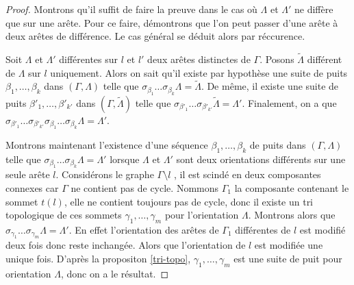 \documentclass[a4paper,10pt]{article}
\begin{document}
\begin{proof}
  Montrons qu'il suffit de faire la preuve dans le cas où $\Lambda$ et $\Lambda'$ ne diffère que sur une arête. Pour ce faire, démontrons que l'on peut passer d'une arête à deux arêtes de différence. Le cas général se déduit alors par réccurence. 

Soit $\Lambda$ et $\Lambda'$ différentes sur $l$ et $l'$ deux arêtes distinctes de $\Gamma$. Posons $\widetilde \Lambda$ différent de $\Lambda$ sur $l$ uniquement. Alors on sait qu'il existe par hypothèse une suite de puits $\beta_{1}, \dots, \beta_{k}$ dans $( \Gamma, \Lambda)$ telle que $\sigma_{\beta_{1}}\dots\sigma_{\beta_{k}}\Lambda = \widetilde \Lambda$. De même, il existe une suite de puits $\beta'_{1}, \dots, \beta'_{k'}$ dans $(\Gamma,\widetilde \Lambda)$ telle que $\sigma_{\beta'_{1}}\dots\sigma_{\beta'_{k'}} \widetilde \Lambda = \Lambda'$. Finalement, on a que $\sigma_{\beta'_{1}}\dots\sigma_{\beta'_{k'}}\sigma_{\beta_{1}}\dots\sigma_{\beta_{k}}\Lambda =  \Lambda'$. 

Montrons maintenant l'existence d'une séquence $\beta_{1}, \dots, \beta_{k}$ de puits dans $(\Gamma,\Lambda)$ telle que $\sigma_{\beta_{1}}\dots\sigma_{\beta_{k}}\Lambda = \Lambda'$ lorsque $\Lambda$ et $\Lambda'$ sont deux orientations différents sur une seule arête $l$. Considérons le graphe $\Gamma \setminus l $ , il est scindé en deux composantes connexes car $\Gamma$ ne contient pas de cycle. Nommons $\Gamma_{1}$ la composante contenant le sommet $t(l)$, elle ne contient toujours pas de cycle, donc il existe un tri topologique de ces sommets $\gamma_{1}, \dots, \gamma_{m}$ pour l'orientation $\Lambda$. Montrons alors que $\sigma_{\gamma_{1}}\dots\sigma_{\gamma_{m}} \Lambda = \Lambda'$. En effet l'orientation des arêtes de $\Gamma_{1}$ différentes de $l$ est modifié deux fois donc reste inchangée. Alors que l'orientation de $l$ est modifiée une unique fois. D'après la propositon \ref{tri-topo}, $\gamma_{1}, \dots, \gamma_{m}$ est une suite de puit pour orientation $\Lambda$, donc on a le résultat.


\end{proof}
\end{document}

